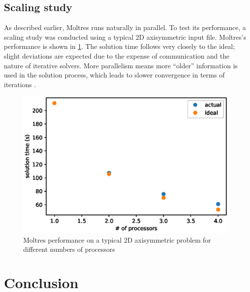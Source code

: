 \documentclass{article}
\let\Oldsection\section
\renewcommand{\section}{\FloatBarrier\Oldsection}
\let\Oldsubsection\subsection
\renewcommand{\subsection}{\FloatBarrier\Oldsubsection}
\begin{document}
\subsection{Scaling study}

As described earlier, Moltres runs naturally in parallel. To test its
performance, a scaling study was conducted using a typical 2D axisymmetric input
file. Moltres's performance is shown in \cref{fig:scaling_study}. The solution
time follows very closely to the ideal; slight deviations are expected due to
the expense of communication and the nature of iterative solvers. More
parallelism means more ``older'' information is used in the solution process,
which leads to slower convergence in terms of iterations \cite{satish_balay_petsc_2015}.

\begin{figure}[htpb]
  \centering
  \includegraphics{scaling_study.eps}
  \caption{Moltres performance on a typical 2D axisymmetric problem for
    different numbers of processors}
  \label{fig:scaling_study}
\end{figure}


\section{Conclusion}
\end{document}
